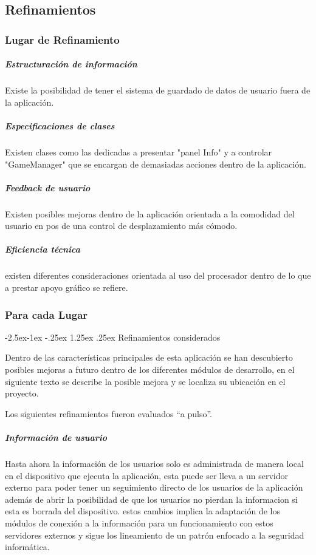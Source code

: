 \documentclass[12pt]{article}
\makeatletter
\renewcommand\paragraph{\@startsection{paragraph}{4}{\z@}%
	{-2.5ex\@plus -1ex \@minus -.25ex}%
	{1.25ex \@plus .25ex}%
	{\normalfont\normalsize\bfseries}}
\makeatother
\begin{document}
\subsection{Refinamientos}

\subsubsection{Lugar de Refinamiento}

\subparagraph{Estructuración de información}
Existe la posibilidad de tener el sistema de guardado de datos de usuario fuera de la aplicación.

\subparagraph{Especificaciones de clases}
Existen clases como las dedicadas a presentar "panel Info" y a controlar "GameManager" que se encargan de demasiadas acciones dentro de la aplicación.

\subparagraph{Feedback de usuario}
Existen posibles mejoras dentro de la aplicación orientada a la comodidad del usuario en pos de una control de desplazamiento más cómodo.

\subparagraph{Eficiencia técnica}
existen diferentes consideraciones orientada al uso del procesador dentro de lo que a prestar apoyo gráfico se refiere.


\subsubsection{Para cada Lugar}
\paragraph{Refinamientos considerados}

Dentro de las características principales de esta aplicación se han descubierto posibles mejoras a futuro dentro de los diferentes módulos de desarrollo, en el siguiente  texto se describe la posible mejora y se localiza su ubicación en el proyecto.

Los siguientes refinamientos fueron evaluados “a pulso”.

\subparagraph{\textbf{Información de usuario}}
Hasta ahora la información de los usuarios solo es administrada de manera local en el dispositivo que ejecuta la aplicación, esta puede ser lleva a un servidor externo para poder tener un seguimiento directo de los usuarios de la aplicación además de abrir la posibilidad de que los usuarios no pierdan la informacion si esta es borrada del dispositivo.
estos cambios implica la adaptación de los módulos de conexión a la información para un funcionamiento con estos servidores externos y sigue los lineamiento de un patrón enfocado a la seguridad informática.
\end{document}
